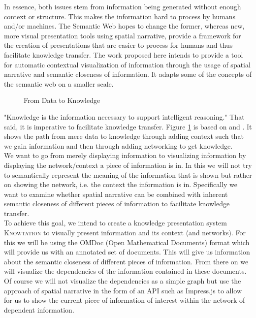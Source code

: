 \documentclass[twoside]{article}
\newcommand{\sys}{\textsc{Knowtation}\xspace}
\begin{document}
In essence, both issues stem from information being generated without enough context or structure. This makes the information hard to process by humans and/or machines. The Semantic Web hopes to change the former, whereas new, more visual presentation tools using spatial narrative, provide a framework for the creation of presentations that are easier to process for humans and thus facilitate knowledge transfer. The work proposed here intends to provide a tool for automatic contextual visualization of information through the usage of spatial narrative and semantic closeness of information. It adapts some of the concepts of the semantic web on a smaller scale.\\

\begin{figure}[H]
        \centering
                \caption{From Data to Knowledge}
                \label{fig:dataknow}
\end{figure}

"Knowledge is the information necessary to support intelligent reasoning." \cite{Kohlhase:Complog:base} That said, it is imperative to facilitate knowledge transfer. Figure \ref{fig:dataknow} is based on \cite{ProbstRaubRomhardt} and \cite{Kohlhase:Complog:base}. It shows the path from mere data to knowledge through adding context such that we gain information and then through adding networking to get knowledge.\\

We want to go from merely displaying information to visualizing information by displaying the network/context a piece of information is in. In this we will not try to semantically represent the meaning of the information that is shown but rather on showing the network, i.e. the context the information is in. Specifically we want to examine whether spatial narrative can be combined with inherent semantic closeness of different pieces of information to facilitate knowledge transfer.\\

To achieve this goal, we intend to create a knowledge presentation system \sys to visually present information and its context (and networks). For this we will be using the OMDoc (Open Mathematical Documents) format which will provide us with an annotated set of documents. This will give us information about the semantic closeness of different pieces of information. From there on we will visualize the dependencies of the information contained in these documents. Of course we will not visualize the dependencies as a simple graph but use the approach of spatial narrative in the form of an API such as Impress.js to allow for us to show the current piece of information of interest within the network of dependent information.\\
\end{document}
